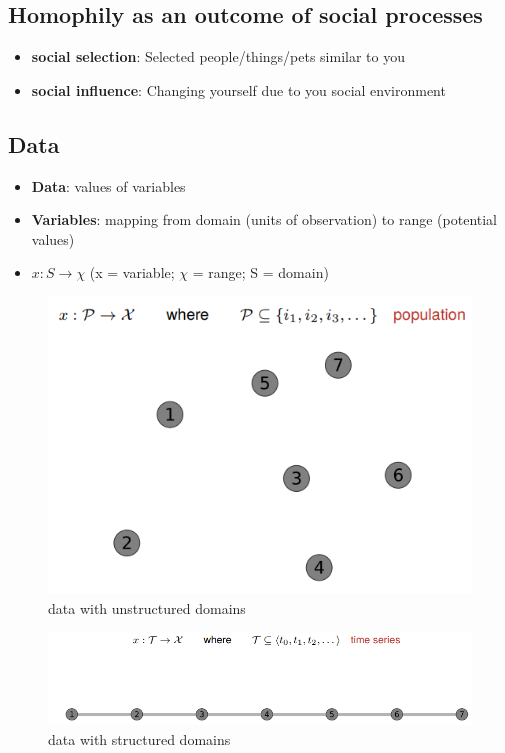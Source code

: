 \documentclass[a4paper,10pt]{article}
\begin{document}
\subsection{Homophily as an outcome of social processes}
\begin{itemize}
    \item \textbf{social selection}: Selected people/things/pets similar to you
    \item \textbf{social influence}: Changing yourself due to you social environment
\end{itemize}
\subsection{Data}
\begin{itemize}
    \item \textbf{Data}: values of variables
    \item \textbf{Variables}: mapping from domain (units of observation) to range (potential values)
    \item $x : S\rightarrow\chi$ (x = variable; $\chi$ = range; S = domain)
\end{itemize}
\begin{figure}[h]
    \centering
    \includegraphics[width=0.7\linewidth]{Images/i6.png}
    \caption{data with unstructured domains}
    \label{fig:enter-label}
\end{figure}
\begin{figure}[h]
    \centering
    \includegraphics[width=0.7\linewidth]{Images/i7.png}
    \caption{data with structured domains}
    \label{fig:enter-label}
\end{figure}
\end{document}
